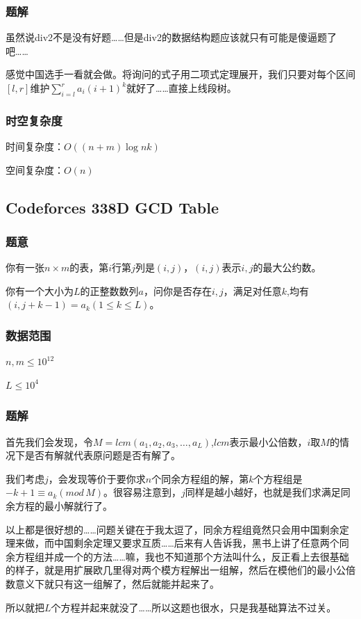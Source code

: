 \documentclass{ctexart}
\begin{document}
\subsubsection{题解}
虽然说div2不是没有好题……但是div2的数据结构题应该就只有可能是傻逼题了吧……

感觉中国选手一看就会做。将询问的式子用二项式定理展开，我们只要对每个区间$[l,r]$维护$\sum\limits_{i=l}^r a_i(i+1)^k$就好了……直接上线段树。
\subsubsection{时空复杂度}
时间复杂度：$O((n+m) \log nk)$

空间复杂度：$O(n)$
\subsection{Codeforces 338D GCD Table}
\subsubsection{题意}
你有一张$n \times m$的表，第$i$行第$j$列是$(i,j)$，$(i,j)$表示$i,j$的最大公约数。

你有一个大小为$L$的正整数数列$a$，问你是否存在$i,j$，满足对任意$k$,均有$(i,j+k-1)=a_k (1 \le k \le L)$。
\subsubsection{数据范围}
$n,m \le 10^{12}$

$L \le 10^4$
\subsubsection{题解}
首先我们会发现，令$M=lcm(a_1,a_2,a_3,\ldots,a_L)$,$lcm$表示最小公倍数，$i$取$M$的情况下是否有解就代表原问题是否有解了。

我们考虑$j$，会发现等价于要你求$n$个同余方程组的解，第$k$个方程组是$-k+1 \equiv a_k (mod\,M)$。很容易注意到，$j$同样是越小越好，也就是我们求满足同余方程的最小解就行了。

以上都是很好想的……问题关键在于我太逗了，同余方程组竟然只会用中国剩余定理来做，而中国剩余定理又要求互质……后来有人告诉我，黑书上讲了任意两个同余方程组并成一个的方法……嘛，我也不知道那个方法叫什么，反正看上去很基础的样子，就是用扩展欧几里得对两个模方程解出一组解，然后在模他们的最小公倍数意义下就只有这一组解了，然后就能并起来了。

所以就把$L$个方程并起来就没了……所以这题也很水，只是我基础算法不过关。
\end{document}
